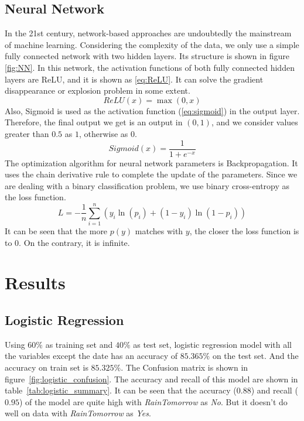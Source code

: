 \documentclass[11pt, a4paper, jou]{apa7}
\begin{document}
\subsection{Neural Network}
    In the 21st century, network-based approaches are undoubtedly the mainstream of machine learning. Considering the complexity of the data, we only use a simple fully connected network with two hidden layers. Its structure is shown in figure \ref{fig:NN}. In this network, the activation functions of both fully connected hidden layers are ReLU\cite{Lu2020}, and it is shown as \ref{eq:ReLU}. It can solve the gradient disappearance or explosion problem in some extent. 
    \begin{equation}
        \label{eq:ReLU}
        ReLU(x) = \max(0,x)
    \end{equation}
    Also, Sigmoid is used as the activation function (\ref{eq:sigmoid}) in the output layer. Therefore, the final output we get is an output in $(0,1)$, and we consider values greater than $0.5$ as $1$, otherwise as $0$. 
    \begin{equation}
        \label{eq:sigmoid}
        Sigmoid(x) = \frac{1}{1+e^{-x}}
    \end{equation}
    The optimization algorithm for neural network parameters is Backpropagation\cite{goodfellow20166}. It uses the chain derivative rule to complete the update of the parameters. Since we are dealing with a binary classification problem, we use binary cross-entropy as the loss function. 
    \begin{equation}
        \label{eq:binary cross_entropy}
        L = -\frac{1}{n}\sum_{i=1}^{n}(y_i\ln(p_i)+(1-y_i)\ln(1-p_i))
    \end{equation}
    It can be seen that the more $p(y)$ matches with $y$, the closer the loss function is to $0$. On the contrary, it is infinite. 

\section{Results}

\subsection{Logistic Regression}
    Using $60\%$ as training set and $40\%$ as test set, logistic regression model with all the variables except the date has an accuracy of $85.365\%$ on the test set. And the accuracy on train set is $85.325\%$. The Confusion matrix is shown in figure~\ref{fig:logistic_confusion}. The accuracy and recall of this model are shown in table~\ref{tab:logistic_summary}. It can be seen that the accuracy ($0.88$) and recall ($0.95$) of the model are quite high with \emph{RainTomorrow} as \emph{No}. But it doesn't do well on data with \emph{RainTomorrow} as \emph{Yes}. 
\end{document}
